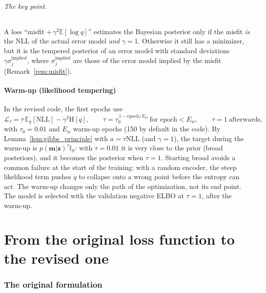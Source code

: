 \documentclass[11pt,a4paper]{article}
\numberwithin{equation}{section}
\theoremstyle{plain}
\theoremstyle{definition}
\theoremstyle{remark}
\newcommand{\m}{\mathbf{m}}
\newcommand{\z}{\mathbf{z}}
\newcommand{\Sset}{\mathcal{S}}
\newcommand{\E}{\mathbb{E}}
\newcommand{\Hent}{\mathrm{H}}
\newcommand{\NLL}{\mathrm{NLL}}
\newcommand{\Lc}{\mathcal{L}}
\newcommand{\ind}{\mathbb{I}}
\begin{document}
\paragraph{The key point.} A loss ``misfit $+\,\gamma^2\E[\log q]$'' estimates the Bayesian posterior only if the misfit \emph{is} the NLL of the actual error model \emph{and} $\gamma=1$. Otherwise it still has a minimizer, but it is the tempered posterior of an error model with standard deviations $\gamma\sigma_j^{\text{implied}}$, where $\sigma_j^{\text{implied}}$ are those of the error model implied by the misfit (Remark~\ref{rem:misfit}).

\subsection{Warm-up (likelihood tempering)}
In the revised code, the first epochs use
\begin{equation}
\Lc_\tau=\tau\,\E_q[\NLL]-\gamma^2\Hent[q],\qquad \tau=\tau_0^{\,1-\text{epoch}/E_w}\ \text{for epoch}<E_w,\qquad\tau=1\ \text{afterwards},
\end{equation}
with $\tau_0=0.01$ and $E_w$ warm-up epochs (150 by default in the code). By Lemma~\ref{lem:gibbs_principle} with $a=\tau\NLL$ (and $\gamma=1$), the target during the warm-up is $p(\m|\z)^\tau\ind_{\Sset}$: with $\tau=0.01$ it is very close to the prior (broad posteriors), and it becomes the posterior when $\tau=1$. Starting broad avoids a common failure at the start of the training: with a random encoder, the steep likelihood term pushes $q$ to collapse onto a wrong point before the entropy can act. The warm-up changes only the path of the optimization, not its end point. The model is selected with the validation negative ELBO at $\tau=1$, after the warm-up.

\part{From the original loss function to the revised one}
\label{part:loss}

\section{The original formulation}
\label{sec:original}
\end{document}
